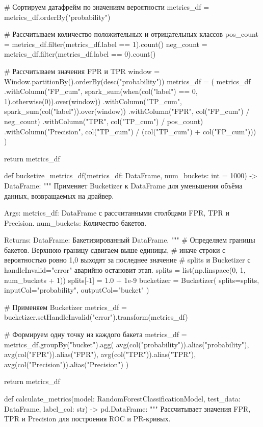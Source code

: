 \begin{code}
    # Сортируем датафрейм по значениям вероятности
    metrics_df = metrics_df.orderBy("probability")

    # Рассчитываем количество положительных и отрицательных классов
    pos_count = metrics_df.filter(metrics_df.label == 1).count()
    neg_count = metrics_df.filter(metrics_df.label == 0).count()

    # Рассчитываем значения FPR и TPR
    window = Window.partitionBy().orderBy(desc("probability"))
    metrics_df = (
        metrics_df
        .withColumn("FP_cum",
                    spark_sum(when(col("label") == 0, 1).otherwise(0)).over(window))
        .withColumn("TP_cum", spark_sum(col("label")).over(window))
        .withColumn("FPR", col("FP_cum") / neg_count)
        .withColumn("TPR", col("TP_cum") / pos_count)
        .withColumn("Precision",
                    col("TP_cum") / (col("TP_cum") + col("FP_cum")))
    )

    return metrics_df

def bucketize_metrics_df(metrics_df: DataFrame,
                         num_buckets: int = 1000) -> DataFrame:
    """
    Применяет Bucketizer к DataFrame для уменьшения объёма данных,
    возвращаемых на драйвер.

    Args:
        metrics_df: DataFrame с рассчитанными столбцами FPR, TPR и Precision.
        num_buckets: Количество бакетов.

    Returns:
        DataFrame: Бакетизированный DataFrame.
    """
    # Определяем границы бакетов. Верхнюю границу сдвигаем выше единицы,
    # иначе строки с вероятностью ровно 1,0 выходят за последнее значение
    # splits и Bucketizer с handleInvalid="error" аварийно остановит этап.
    splits = list(np.linspace(0, 1, num_buckets + 1))
    splits[-1] = 1.0 + 1e-9
    bucketizer = Bucketizer(
        splits=splits,
        inputCol="probability",
        outputCol="bucket"
    )

    # Применяем Bucketizer
    metrics_df = bucketizer.setHandleInvalid("error").transform(metrics_df)

    # Формируем одну точку из каждого бакета
    metrics_df = metrics_df.groupBy("bucket").agg(
        avg(col("probability")).alias("probability"),
        avg(col("FPR")).alias("FPR"),
        avg(col("TPR")).alias("TPR"),
        avg(col("Precision")).alias("Precision")
    )

    return metrics_df

def calculate_metrics(model: RandomForestClassificationModel,
                      test_data: DataFrame,
                      label_col: str) -> pd.DataFrame:
    """
    Рассчитывает значения FPR, TPR и Precision для построения ROC и PR-кривых.


\end{code}
